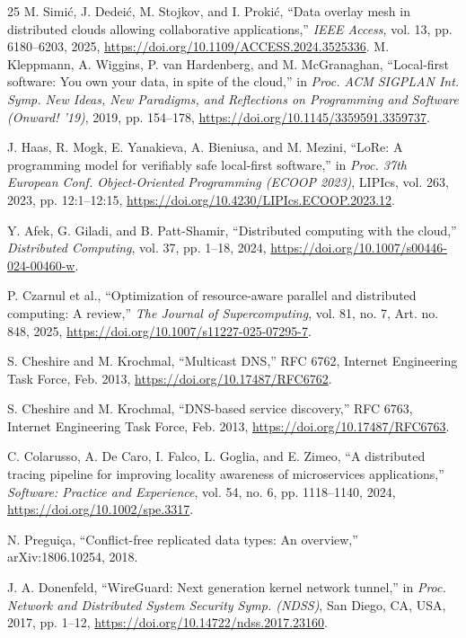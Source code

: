 \documentclass[10pt,twocolumn]{article}
\newcommand{\doi}[1]{\url{https://doi.org/#1}}
\begin{document}
\clearpage 
\begin{thebibliography}{25}
 M. Simi\'{c}, J. Dedei\'{c}, M. Stojkov, and I. Proki\'{c}, ``Data overlay mesh in distributed clouds allowing collaborative applications,'' \emph{IEEE Access}, vol. 13, pp. 6180--6203, 2025, \doi{10.1109/ACCESS.2024.3525336}.
 M. Kleppmann, A. Wiggins, P. van Hardenberg, and M. McGranaghan, ``Local-first software: You own your data, in spite of the cloud,'' in \emph{Proc. ACM SIGPLAN Int. Symp. New Ideas, New Paradigms, and Reflections on Programming and Software (Onward! '19)}, 2019, pp. 154--178, \doi{10.1145/3359591.3359737}.
	
 J. Haas, R. Mogk, E. Yanakieva, A. Bieniusa, and M. Mezini, ``LoRe: A programming model for verifiably safe local-first software,'' in \emph{Proc. 37th European Conf. Object-Oriented Programming (ECOOP 2023)}, LIPIcs, vol. 263, 2023, pp. 12:1--12:15, \doi{10.4230/LIPIcs.ECOOP.2023.12}.
	
 Y. Afek, G. Giladi, and B. Patt-Shamir, ``Distributed computing with the cloud,'' \emph{Distributed Computing}, vol. 37, pp. 1--18, 2024, \doi{10.1007/s00446-024-00460-w}.
	
 P. Czarnul et al., ``Optimization of resource-aware parallel and distributed computing: A review,'' \emph{The Journal of Supercomputing}, vol. 81, no. 7, Art. no. 848, 2025, \doi{10.1007/s11227-025-07295-7}.
	
 S. Cheshire and M. Krochmal, ``Multicast DNS,'' RFC 6762, Internet Engineering Task Force, Feb. 2013, \doi{10.17487/RFC6762}.
	
 S. Cheshire and M. Krochmal, ``DNS-based service discovery,'' RFC 6763, Internet Engineering Task Force, Feb. 2013, \doi{10.17487/RFC6763}.
	
 C. Colarusso, A. De Caro, I. Falco, L. Goglia, and E. Zimeo, ``A distributed tracing pipeline for improving locality awareness of microservices applications,'' \emph{Software: Practice and Experience}, vol. 54, no. 6, pp. 1118--1140, 2024, \doi{10.1002/spe.3317}.
	
	 N. Pregui\c{c}a, ``Conflict-free replicated data types: An overview,'' arXiv:1806.10254, 2018.
	
 J. A. Donenfeld, ``WireGuard: Next generation kernel network tunnel,'' in \emph{Proc. Network and Distributed System Security Symp. (NDSS)}, San Diego, CA, USA, 2017, pp. 1--12, \doi{10.14722/ndss.2017.23160}.
	

\end{thebibliography}
\end{document}
